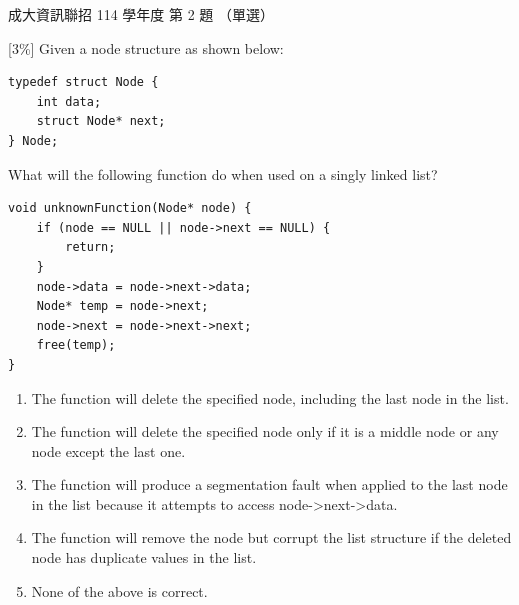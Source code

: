 \begin{pastexam}[label={px:ncku-114-prog-02}]{成大資訊聯招 114 學年度 第 2 題}
（單選）

{[3\%]} Given a node structure as shown below:
\begin{verbatim}
typedef struct Node {
    int data;
    struct Node* next;
} Node;
\end{verbatim}
What will the following function do when used on a singly linked list?
\begin{verbatim}
void unknownFunction(Node* node) {
    if (node == NULL || node->next == NULL) {
        return;
    }
    node->data = node->next->data;
    Node* temp = node->next;
    node->next = node->next->next;
    free(temp);
}
\end{verbatim}
\begin{enumerate}[label=(\Alph*)]
\item The function will delete the specified node, including the last node in the list.
\item The function will delete the specified node only if it is a middle node or any node except the last one.
\item The function will produce a segmentation fault when applied to the last node in the list because it attempts to access node->next->data.
\item The function will remove the node but corrupt the list structure if the deleted node has duplicate values in the list.
\item None of the above is correct.
\end{enumerate}
\end{pastexam}

